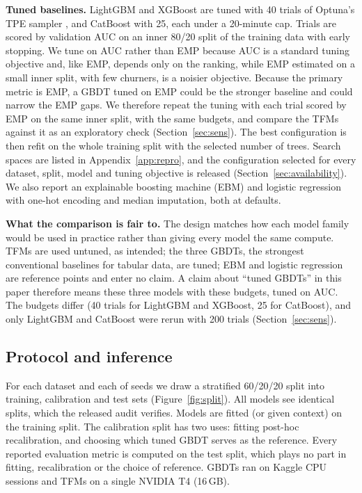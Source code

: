 \documentclass[11pt]{article}
\newcommand{\tfms}{TFMs\xspace}
\begin{document}
\textbf{Tuned baselines.} LightGBM \cite{ke2017lightgbm} and XGBoost \cite{chen2016xgboost} are tuned with 40 trials
of Optuna's TPE sampler \cite{akiba2019optuna}, and CatBoost \cite{prokhorenkova2018catboost} with 25, each under a
20-minute cap. Trials are scored by validation AUC on an inner 80/20 split of the training data with early stopping.
We tune on AUC rather than EMP because AUC is a standard tuning objective and, like EMP, depends only on the ranking,
while EMP estimated on a small inner split, with few churners, is a noisier objective.
Because the primary metric is EMP, a GBDT tuned on EMP could be the stronger baseline and could narrow the EMP gaps.
We therefore repeat the tuning with each trial scored by EMP on the same inner split, with the same budgets, and
compare the \tfms against it as an exploratory check (Section~\ref{sec:sens}). The best
configuration is then refit on the whole training split with the selected number of trees. Search spaces are listed
in Appendix~\ref{app:repro}, and the configuration selected for every dataset, split, model and tuning objective is
released (Section~\ref{sec:availability}). We also report an explainable boosting machine (EBM) \cite{nori2019interpretml} and
logistic regression with one-hot encoding and median imputation, both at defaults.

\textbf{What the comparison is fair to.} The design matches how each model family would be used in practice rather
than giving every model the same compute. \tfms are used untuned, as intended; the three GBDTs, the strongest
conventional baselines for tabular data, are tuned; EBM and logistic regression are reference points and enter no
claim. A claim about ``tuned GBDTs'' in this paper therefore means these three models with these budgets, tuned on AUC.
The budgets differ (40 trials for LightGBM and XGBoost, 25 for CatBoost), and only LightGBM and CatBoost were rerun with
200 trials (Section~\ref{sec:sens}).

\subsection{Protocol and inference}\label{sec:inference}
For each dataset and each of \nSeeds{} seeds we draw a stratified 60/20/20 split into training, calibration and test
sets (Figure~\ref{fig:split}). All models see identical splits, which the released audit verifies. Models are fitted
(or given context) on the training split. The calibration split has two uses: fitting post-hoc recalibration, and
choosing which tuned GBDT serves as the reference. Every reported evaluation metric is computed on the test split, which
plays no part in fitting, recalibration or the choice of reference. GBDTs ran on Kaggle CPU sessions and \tfms on a
single NVIDIA T4 (16\,GB).
\end{document}
